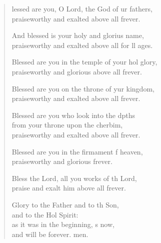 \begin{verse}
  \begin{patverse}
lessed are you, O Lord, the God of ur fathers,\Med\\
praiseworthy and exalted above all frever.

And blessed is your holy and glorius name,\Med\\
praiseworthy and exalted above all for ll ages.

Blessed are you in the temple of your hol glory,\Med\\
praiseworthy and glorious above all frever.

Blessed are you on the throne of yur kingdom,\Med\\
praiseworthy and exalted above all frever.

Blessed are you who look into the dpths\Flex\\
from your throne upon the cherbim,\Med\\
praiseworthy and exalted above all frever.

Blessed are you in the firmament f heaven,\Med\\
praiseworthy and glorious frever.

Bless the Lord, all you works of th Lord,\Med\\
praise and exalt him above all frever.

Glory to the Father and to th Son,\Med\\
and to the Hol Spirit:\\
as it was in the beginning, \pointup{\i}s now,\Med\\
and will be forever. men. 
  \end{patverse}
\end{verse}
